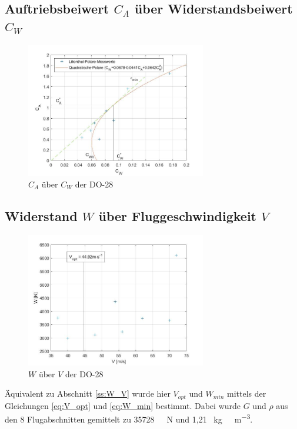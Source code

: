 \subsection{Auftriebsbeiwert $C_{A}$ über Widerstandsbeiwert $C_{W}$}

\begin{figure}[H]
	\centering	\includegraphics[width=0.7\textwidth]{./Bilder/CA_CW_DO28_NEU.jpg}
	\caption{$C_{A}$ über $C_{W}$ der DO-28}
	\label{fig:CA_CW_DO28}
\end{figure}

\subsection{Widerstand $W$ über Fluggeschwindigkeit $V$}

\begin{figure}[H]
	\centering	\includegraphics[width=0.7\textwidth]{./Bilder/W_V_DO28_NEU.jpg}
	\caption{$W$ über $V$ der DO-28}
	\label{fig:W_V_DO28}
\end{figure}

Äquivalent zu Abschnitt \ref{ss:W_V} wurde hier $V_{opt}$ und $W_{min}$ mittels der Gleichungen \ref{eq:V_opt} und \ref{eq:W_min} bestimmt. Dabei wurde $G$ und $\rho$ aus den 8 Flugabschnitten gemittelt zu \SI{35728}{\ \newton} und 1,21 \SI{}{\kilogram\ \meter^{-3}}.

